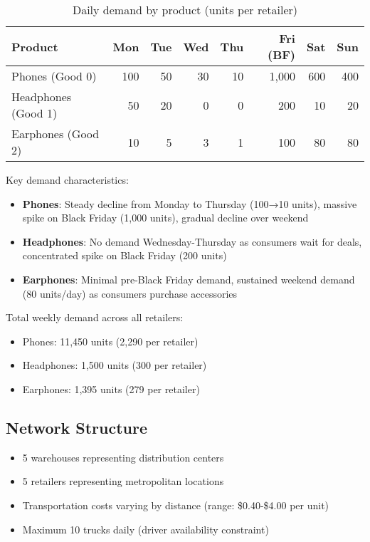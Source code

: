 \documentclass[a4paper,12pt]{article}
\begin{document}
\begin{table}[h]
\centering
\caption{Daily demand by product (units per retailer)}
\begin{tabular}{lrrrrrrr}
\toprule
Product & Mon & Tue & Wed & Thu & Fri (BF) & Sat & Sun \\
\midrule
Phones (Good 0) & 100 & 50 & 30 & 10 & 1,000 & 600 & 400 \\
Headphones (Good 1) & 50 & 20 & 0 & 0 & 200 & 10 & 20 \\
Earphones (Good 2) & 10 & 5 & 3 & 1 & 100 & 80 & 80 \\
\bottomrule
\end{tabular}\label{tab:table2}
\end{table}

Key demand characteristics:
\begin{itemize}
    \item \textbf{Phones}: Steady decline from Monday to Thursday (100→10 units), massive spike on Black Friday (1,000 units), gradual decline over weekend
    \item \textbf{Headphones}: No demand Wednesday-Thursday as consumers wait for deals, concentrated spike on Black Friday (200 units)
    \item \textbf{Earphones}: Minimal pre-Black Friday demand, sustained weekend demand (80 units/day) as consumers purchase accessories
\end{itemize}

Total weekly demand across all retailers:
\begin{itemize}
    \item Phones: 11,450 units (2,290 per retailer)
    \item Headphones: 1,500 units (300 per retailer)
    \item Earphones: 1,395 units (279 per retailer)
\end{itemize}

\subsection{Network Structure}\label{subsec:network-structure}
\begin{itemize}
    \item 5 warehouses representing distribution centers
    \item 5 retailers representing metropolitan locations
    \item Transportation costs varying by distance (range: \$0.40-\$4.00 per unit)
    \item Maximum 10 trucks daily (driver availability constraint)
\end{itemize}
\end{document}
